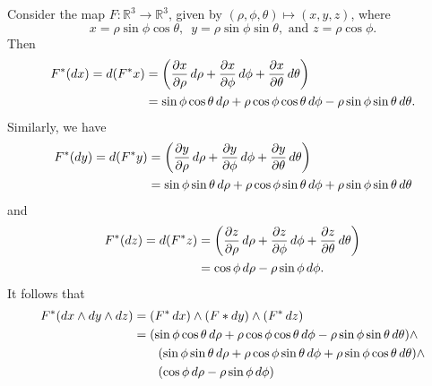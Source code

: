 \documentclass[notoc,notitlepage]{tufte-book}
\begin{document}
\begin{eg}
  Consider the map $F : \mathbb{R}^3 \to \mathbb{R}^3$, given by $(\rho, \phi, \theta)
  \mapsto (x, y, z)$, where
  \begin{equation*}
    x = \rho \sin \phi \cos \theta, \enspace y = \rho \sin \phi \sin \theta, \text{ and }
    z = \rho \cos \phi.
  \end{equation*}
  Then
  \begin{align*}
    F^*(\dif{x}) = \dif{(F^* x)} &= \left( \frac{\partial x}{\partial \rho} \dif{\rho} +
      \frac{\partial x}{\partial \phi} \dif{\phi} + \frac{\partial x}{\partial \theta}
      \dif{\theta} \right) \\
                                 &= \sin \phi \cos \theta \dif{\rho} + \rho \cos \phi \cos
      \theta \dif{\phi} - \rho \sin \phi \sin \theta \dif{\theta}.
  \end{align*}
  Similarly, we have
  \begin{align*}
    F^*(\dif{y}) = \dif{(F^* y)} &= \left( \frac{\partial y}{\partial \rho} \dif{\rho} +
      \frac{\partial y}{\partial \phi} \dif{\phi} + \frac{\partial y}{\partial \theta}
      \dif{\theta} \right) \\
                                 &= \sin \phi \sin \theta \dif{\rho} + \rho \cos \phi \sin
      \theta \dif{\phi} + \rho \sin \phi \sin \theta \dif{\theta}
  \end{align*}
  and
  \begin{align*}
    F^*(\mathop{}\!d{z}) = \mathop{}\!d{(F^* z)} &= \left( \frac{\partial z}{\partial \rho} \mathop{}\!d{\rho} +
      \frac{\partial z}{\partial \phi} \mathop{}\!d{\phi} + \frac{\partial z}{\partial \theta}
      \mathop{}\!d{\theta} \right) \\
                                 &= \cos \phi \mathop{}\!d{\rho} - \rho \sin \phi \mathop{}\!d{\phi}.
  \end{align*}
  It follows that
  \begin{align*}
    F^* (\dif{x} \land \dif{y} \land \dif{z})
    &= (F^* \dif{x}) \land (F* \dif{y}) \land (F^* \dif{z}) \\
    &= (\sin \phi \cos \theta \dif{\rho} + \rho \cos \phi \cos \theta \dif{\phi} - \rho
      \sin \phi \sin \theta \dif{\theta}) \land \\
    &\qquad (\sin \phi \sin \theta \dif{\rho} + \rho \cos \phi \sin \theta \dif{\phi} +
      \rho \sin \phi \cos \theta \dif{\theta}) \land \\
    &\qquad (\cos \phi \dif{\rho} - \rho \sin \phi \dif{\phi}) \\

\end{align*}
\end{eg}
\end{document}
